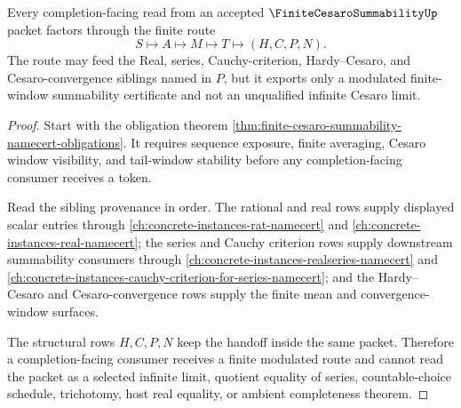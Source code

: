 \begin{theorem}
\label{thm:finite-cesaro-summability-completion-route}
Every completion-facing read from an accepted $\FiniteCesaroSummabilityUp$ packet factors through the finite route
$$
S\longmapsto A\longmapsto M\longmapsto T\longmapsto (H,C,P,N).
$$
The route may feed the Real, series, Cauchy-criterion, Hardy--Cesaro, and Cesaro-convergence siblings named in $P$, but it exports only a modulated finite-window summability certificate and not an unqualified infinite Cesaro limit.
\end{theorem}
\begin{proof}
Start with the obligation theorem \autoref{thm:finite-cesaro-summability-namecert-obligations}. It requires sequence exposure, finite averaging, Cesaro window visibility, and tail-window stability before any completion-facing consumer receives a token.

Read the sibling provenance in order. The rational and real rows supply displayed scalar entries through \autoref{ch:concrete-instances-rat-namecert} and \autoref{ch:concrete-instances-real-namecert}; the series and Cauchy criterion rows supply downstream summability consumers through \autoref{ch:concrete-instances-realseries-namecert} and \autoref{ch:concrete-instances-cauchy-criterion-for-series-namecert}; and the Hardy--Cesaro and Cesaro-convergence rows supply the finite mean and convergence-window surfaces.

The structural rows $H,C,P,N$ keep the handoff inside the same packet. Therefore a completion-facing consumer receives a finite modulated route and cannot read the packet as a selected infinite limit, quotient equality of series, countable-choice schedule, trichotomy, host real equality, or ambient completeness theorem.
\end{proof}



